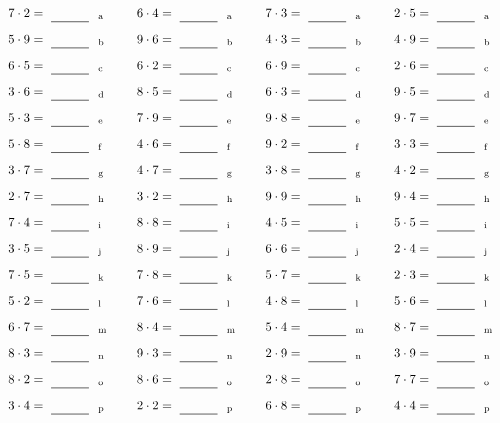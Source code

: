 \documentclass
[
  draft    = true,
  fontsize = 11pt,
  parskip  = half-
]
{scrartcl}
\begin{document}
\par\vfill\par
\begin{align*}
    \pline{7\cdot2}&=\rline{a}
  & \pline{6\cdot4}&=\rline{a}
  & \pline{7\cdot3}&=\rline{a}
  & \pline{2\cdot5}&=\rline{a} \\[1ex]
    \pline{5\cdot9}&=\rline{b}
  & \pline{9\cdot6}&=\rline{b}
  & \pline{4\cdot3}&=\rline{b}
  & \pline{4\cdot9}&=\rline{b} \\[1ex]
    \pline{6\cdot5}&=\rline{c}
  & \pline{6\cdot2}&=\rline{c}
  & \pline{6\cdot9}&=\rline{c}
  & \pline{2\cdot6}&=\rline{c} \\[1ex]
    \pline{3\cdot6}&=\rline{d}
  & \pline{8\cdot5}&=\rline{d}
  & \pline{6\cdot3}&=\rline{d}
  & \pline{9\cdot5}&=\rline{d} \\[1ex]
    \pline{5\cdot3}&=\rline{e}
  & \pline{7\cdot9}&=\rline{e}
  & \pline{9\cdot8}&=\rline{e}
  & \pline{9\cdot7}&=\rline{e} \\[1ex]
    \pline{5\cdot8}&=\rline{f}
  & \pline{4\cdot6}&=\rline{f}
  & \pline{9\cdot2}&=\rline{f}
  & \pline{3\cdot3}&=\rline{f} \\[1ex]
    \pline{3\cdot7}&=\rline{g}
  & \pline{4\cdot7}&=\rline{g}
  & \pline{3\cdot8}&=\rline{g}
  & \pline{4\cdot2}&=\rline{g} \\[1ex]
    \pline{2\cdot7}&=\rline{h}
  & \pline{3\cdot2}&=\rline{h}
  & \pline{9\cdot9}&=\rline{h}
  & \pline{9\cdot4}&=\rline{h} \\[1ex]
    \pline{7\cdot4}&=\rline{i}
  & \pline{8\cdot8}&=\rline{i}
  & \pline{4\cdot5}&=\rline{i}
  & \pline{5\cdot5}&=\rline{i} \\[1ex]
    \pline{3\cdot5}&=\rline{j}
  & \pline{8\cdot9}&=\rline{j}
  & \pline{6\cdot6}&=\rline{j}
  & \pline{2\cdot4}&=\rline{j} \\[1ex]
    \pline{7\cdot5}&=\rline{k}
  & \pline{7\cdot8}&=\rline{k}
  & \pline{5\cdot7}&=\rline{k}
  & \pline{2\cdot3}&=\rline{k} \\[1ex]
    \pline{5\cdot2}&=\rline{l}
  & \pline{7\cdot6}&=\rline{l}
  & \pline{4\cdot8}&=\rline{l}
  & \pline{5\cdot6}&=\rline{l} \\[1ex]
    \pline{6\cdot7}&=\rline{m}
  & \pline{8\cdot4}&=\rline{m}
  & \pline{5\cdot4}&=\rline{m}
  & \pline{8\cdot7}&=\rline{m} \\[1ex]
    \pline{8\cdot3}&=\rline{n}
  & \pline{9\cdot3}&=\rline{n}
  & \pline{2\cdot9}&=\rline{n}
  & \pline{3\cdot9}&=\rline{n} \\[1ex]
    \pline{8\cdot2}&=\rline{o}
  & \pline{8\cdot6}&=\rline{o}
  & \pline{2\cdot8}&=\rline{o}
  & \pline{7\cdot7}&=\rline{o} \\[1ex]
    \pline{3\cdot4}&=\rline{p}
  & \pline{2\cdot2}&=\rline{p}
  & \pline{6\cdot8}&=\rline{p}
  & \pline{4\cdot4}&=\rline{p}
\end{align*}
\end{document}
